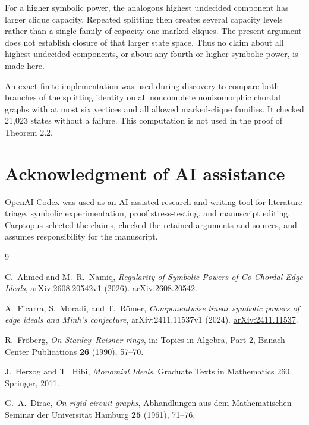 \documentclass[11pt]{article}
\theoremstyle{definition}
\theoremstyle{remark}
\numberwithin{equation}{section}
\begin{document}
For a higher symbolic power, the analogous highest undecided component has
larger clique capacity. Repeated splitting then creates several capacity
levels rather than a single family of capacity-one marked cliques. The present
argument does not establish closure of that larger state space. Thus no claim
about all highest undecided components, or about any fourth or higher symbolic
power, is made here.

An exact finite implementation was used during discovery to compare both
branches of the splitting identity on all noncomplete nonisomorphic chordal
graphs with at most six vertices and all allowed marked-clique families. It
checked 21,023 states without a failure. This computation is not used in the
proof of Theorem 2.2.

\section*{Acknowledgment of AI assistance}


OpenAI Codex was used as an AI-assisted research and writing tool for
literature triage, symbolic experimentation, proof stress-testing, and
manuscript editing. Carptopus selected the claims, checked the retained
arguments and sources, and assumes responsibility for the manuscript.

\begin{thebibliography}{9}
\footnotesize
\raggedright

C.~Ahmed and M.~R.~Namiq,
\emph{Regularity of Symbolic Powers of Co-Chordal Edge Ideals},
arXiv:2608.20542v1 (2026).
\href{https://arxiv.org/abs/2608.20542}{arXiv:2608.20542}.

A.~Ficarra, S.~Moradi, and T.~R\"omer,
\emph{Componentwise linear symbolic powers of edge ideals and Minh's conjecture},
arXiv:2411.11537v1 (2024).
\href{https://arxiv.org/abs/2411.11537}{arXiv:2411.11537}.

R.~Fr\"oberg,
\emph{On Stanley--Reisner rings},
in: Topics in Algebra, Part 2, Banach Center Publications \textbf{26} (1990),
57--70.

J.~Herzog and T.~Hibi,
\emph{Monomial Ideals},
Graduate Texts in Mathematics 260, Springer, 2011.

G.~A.~Dirac,
\emph{On rigid circuit graphs},
Abhandlungen aus dem Mathematischen Seminar der Universit\"at Hamburg
\textbf{25} (1961), 71--76.

\end{thebibliography}
\end{document}
